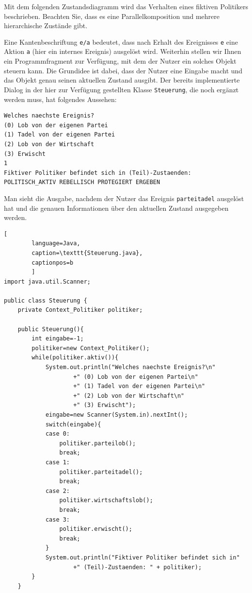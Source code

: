 \documentclass{abgabe}
\begin{document}
\begin{questions}

    Mit dem folgenden Zustandsdiagramm wird das Verhalten eines fiktiven Politikers beschrieben.
    Beachten Sie, dass es eine Parallelkomposition und mehrere hierarchische Zustände gibt.

    Eine Kantenbeschriftung \texttt{e/a} bedeutet, dass nach Erhalt des Ereignisses \texttt{e} eine Aktion \texttt{a} (hier ein internes Ereignis) ausgelöst wird.
    Weiterhin stellen wir Ihnen ein Programmfragment zur Verfügung, mit dem der Nutzer ein solches Objekt steuern kann.
    Die Grundidee ist dabei, dass der Nutzer eine Eingabe macht und das Objekt genau seinen aktuellen Zustand ausgibt.
    Der bereits implementierte Dialog in der hier zur Verfügung gestellten Klasse \texttt{Steuerung}, die noch ergänzt werden muss, hat folgendes Aussehen:

    \begin{lstlisting}
Welches naechste Ereignis?
(0) Lob von der eigenen Partei
(1) Tadel von der eigenen Partei
(2) Lob von der Wirtschaft
(3) Erwischt
1
Fiktiver Politiker befindet sich in (Teil)-Zustaenden:
POLITISCH_AKTIV REBELLISCH PROTEGIERT ERGEBEN
    \end{lstlisting}

    Man sieht die Ausgabe, nachdem der Nutzer das Ereignis \texttt{parteitadel} ausgelöst hat und die genauen Informationen über den aktuellen Zustand ausgegeben werden.

    \newpage

    \begin{lstlisting}[
        language=Java, 
        caption=\texttt{Steuerung.java}, 
        captionpos=b
        ]
import java.util.Scanner;

public class Steuerung {
    private Context_Politiker politiker;	
    
    public Steuerung(){
        int eingabe=-1;
        politiker=new Context_Politiker();
        while(politiker.aktiv()){
            System.out.println("Welches naechste Ereignis?\n"
                    +" (0) Lob von der eigenen Partei\n"
                    +" (1) Tadel von der eigenen Partei\n"
                    +" (2) Lob von der Wirtschaft\n"
                    +" (3) Erwischt");
            eingabe=new Scanner(System.in).nextInt();
            switch(eingabe){
            case 0: 
                politiker.parteilob();
                break;
            case 1:
                politiker.parteitadel();
                break;
            case 2:
                politiker.wirtschaftslob();
                break;
            case 3:
                politiker.erwischt();
                break;
            }
            System.out.println("Fiktiver Politiker befindet sich in"
                    +" (Teil)-Zustaenden: " + politiker);
        }
    }
    

\end{lstlisting}
\end{questions}
\end{document}
